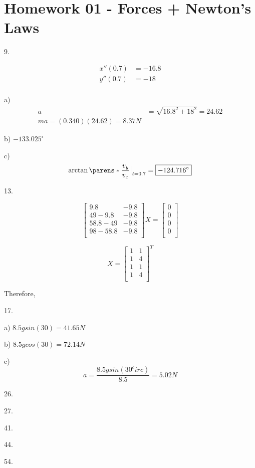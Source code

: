 \documentclass{scrreprt} %
\begin{document}
\section{Homework 01 - Forces + Newton's Laws}

9.

\begin{align*}
	x''(0.7) &= -16.8 \\
	y''(0.7) &= -18 \\
\end{align*}

a) \begin{align*}
a &= \sqrt{16.8^2 + 18^2} = 24.62 \\
ma = (0.340)(24.62) = \boxed{8.37 N}
\end{align*}

b) $-133.025^\circ$

c) $$\evalat{\arctan \parens*{\frac{v_y}{v_x}}}{t = 0.7} = \boxed{-124.716^\circ}$$

13.

$$
\begin{bmatrix}
	9.8 & - 9.8 \\
	49 - 9.8 & -9.8 \\
	58.8 - 49 & -9.8 \\
	98 - 58.8 & -9.8 \\
\end{bmatrix}
X
=
\begin{bmatrix}
	0 \\
	0 \\
	0 \\
	0 \\
\end{bmatrix}
$$

$$
X = \begin{bmatrix}
	1 & 1 \\
	1 & 4 \\
	1 & 1 \\
	1 & 4 \\
\end{bmatrix}^T
$$

Therefore, 

17.

a) $8.5gsin(30) = \boxed{41.65} N$

b) $8.5gcos(30) = \boxed{72.14} N$

c) $$a = \frac{8.5gsin(30^circ)}{8.5} = 5.02 N$$

26.

27.

41.

44.

54.
\end{document}
